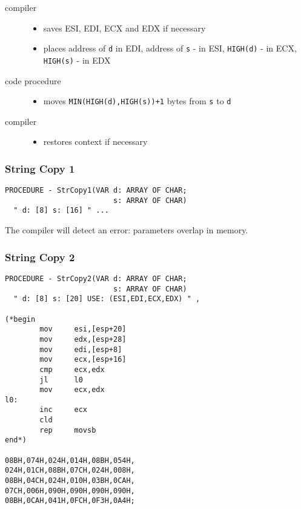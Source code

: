 \begin{description}
\item[compiler] \mbox{}
   \begin{itemize}
     \item saves ESI, EDI, ECX and EDX if necessary
     \item places address of {\tt d} in EDI, address of {\tt s} - in ESI,
           {\tt HIGH(d)} - in ECX, {\tt HIGH(s)} - in EDX
   \end{itemize}
\item[code procedure] \mbox{}
   \begin{itemize}
   \item moves {\tt MIN(HIGH(d),HIGH(s))+1} bytes from {\tt s} to {\tt d}
   \end{itemize}
\item[compiler] \mbox{}
   \begin{itemize}
   \item restores context if necessary
   \end{itemize}
\end{description}

\subsubsection{String Copy 1}

\begin{verbatim}
PROCEDURE - StrCopy1(VAR d: ARRAY OF CHAR;
                         s: ARRAY OF CHAR)
  " d: [8] s: [16] " ...
\end{verbatim}

The compiler will detect an error: parameters overlap in memory.


\subsubsection{String Copy 2}

\begin{verbatim}
PROCEDURE - StrCopy2(VAR d: ARRAY OF CHAR;
                         s: ARRAY OF CHAR)
  " d: [8] s: [20] USE: (ESI,EDI,ECX,EDX) " ,

(*begin
        mov     esi,[esp+20]
        mov     edx,[esp+28]
        mov     edi,[esp+8]
        mov     ecx,[esp+16]
        cmp     ecx,edx
        jl      l0
        mov     ecx,edx
l0:
        inc     ecx
        cld
        rep     movsb
end*)

08BH,074H,024H,014H,08BH,054H,
024H,01CH,08BH,07CH,024H,008H,
08BH,04CH,024H,010H,03BH,0CAH,
07CH,006H,090H,090H,090H,090H,
08BH,0CAH,041H,0FCH,0F3H,0A4H;
\end{verbatim}

